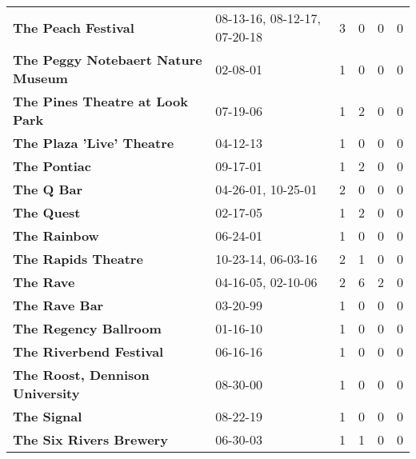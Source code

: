 \begin{supertabular}{llllll}
                                          \textbf{The Peach Festival} &  08-13-16, 08-12-17, 07-20-18 &  3 &   0 &  0 &  0 \\
                           \textbf{The Peggy Notebaert Nature Museum} &                      02-08-01 &  1 &   0 &  0 &  0 \\
                              \textbf{The Pines Theatre at Look Park} &                      07-19-06 &  1 &   2 &  0 &  0 \\
                                    \textbf{The Plaza 'Live' Theatre} &                      04-12-13 &  1 &   0 &  0 &  0 \\
                                                 \textbf{The Pontiac} &                      09-17-01 &  1 &   2 &  0 &  0 \\
                                                   \textbf{The Q Bar} &            04-26-01, 10-25-01 &  2 &   0 &  0 &  0 \\
                                                   \textbf{The Quest} &                      02-17-05 &  1 &   2 &  0 &  0 \\
                                                 \textbf{The Rainbow} &                      06-24-01 &  1 &   0 &  0 &  0 \\
                                          \textbf{The Rapids Theatre} &            10-23-14, 06-03-16 &  2 &   1 &  0 &  0 \\
                                                    \textbf{The Rave} &            04-16-05, 02-10-06 &  2 &   6 &  2 &  0 \\
                                                \textbf{The Rave Bar} &                      03-20-99 &  1 &   0 &  0 &  0 \\
                                        \textbf{The Regency Ballroom} &                      01-16-10 &  1 &   0 &  0 &  0 \\
                                      \textbf{The Riverbend Festival} &                      06-16-16 &  1 &   0 &  0 &  0 \\
                              \textbf{The Roost, Dennison University} &                      08-30-00 &  1 &   0 &  0 &  0 \\
                                                  \textbf{The Signal} &                      08-22-19 &  1 &   0 &  0 &  0 \\
                                      \textbf{The Six Rivers Brewery} &                      06-30-03 &  1 &   1 &  0 &  0 \\

\end{supertabular}
